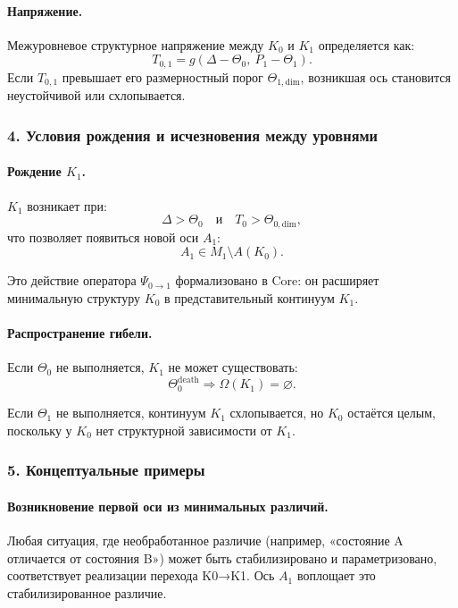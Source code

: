 \paragraph{Напряжение.}
Межуровневое структурное напряжение между $K_0$ и $K_1$ определяется как:
\[
T_{0,1} = g(\Delta - \Theta_0,\ P_1 - \Theta_1).
\]
Если $T_{0,1}$ превышает его размерностный порог $\Theta_{1,\mathrm{dim}}$,
возникшая ось становится неустойчивой или схлопывается.

\subsubsection{4. Условия рождения и исчезновения между уровнями}

\paragraph{Рождение \texorpdfstring{$K_1$}{K_1}.}
$K_1$ возникает при:
\[
\Delta > \Theta_0
\quad \text{и} \quad
T_0 > \Theta_{0,\mathrm{dim}},
\]
что позволяет появиться новой оси $A_1$:
\[
A_1 \in M_1 \setminus A(K_0).
\]

Это действие оператора $\Psi_{0\rightarrow 1}$ формализовано в Core:
он расширяет минимальную структуру $K_0$ в представительный континуум
$K_1$.

\paragraph{Распространение гибели.}
Если $\Theta_0$ не выполняется, $K_1$ не может существовать:
\[
\Theta_0^{\mathrm{death}}
\Rightarrow \Omega(K_1)=\varnothing.
\]

Если $\Theta_1$ не выполняется, континуум $K_1$ схлопывается, но $K_0$
остаётся целым, поскольку у $K_0$ нет структурной зависимости от $K_1$.

\subsubsection{5. Концептуальные примеры}

\paragraph{Возникновение первой оси из минимальных различий.}
Любая ситуация, где необработанное различие (например, «состояние A отличается
от состояния B») может быть стабилизировано и параметризовано, соответствует
реализации перехода K0→K1. Ось $A_1$ воплощает это стабилизированное
различие.


